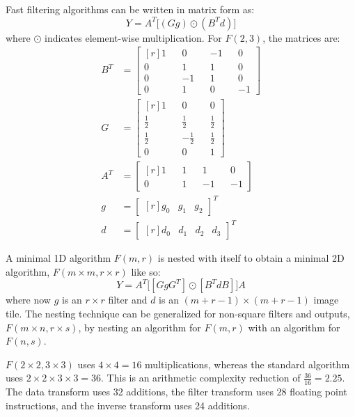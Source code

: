 \documentclass[10pt,twocolumn,letterpaper]{article}
\begin{document}
Fast filtering algorithms can be written in matrix form as:
\begin{equation}\label{eq:F_2_3_matrix}
Y = A^T \big[(G g) \odot( B^T d)\big]
\end{equation}
where $\odot$ indicates element-wise multiplication. For $F(2,3)$, the matrices are:
\begin{equation}\label{eq:F_2_2_3_3_matrices}
\begin{split}
B^T &= \begin{bmatrix*}[r]
1 && 0 && -1 && 0 \\
0 && 1 && 1 && 0 \\
0 && -1 && 1 && 0 \\
0 && 1 && 0 && -1
\end{bmatrix*} \\ 
G  &= \begin{bmatrix*}[r]
1 && 0 && 0 \\
\frac{1}{2} && \frac{1}{2} && \frac{1}{2} \\
\frac{1}{2} && - \frac{1}{2} && \frac{1}{2} \\
0 && 0 && 1
\end{bmatrix*} \\
A^T &= \begin{bmatrix*}[r]
1 && 1 && 1 && 0\\
0 && 1 && -1 && -1 
\end{bmatrix*} \\
g &= \begin{bmatrix*}[r]
g_0 & g_1 & g_2
\end{bmatrix*}^T \\
d &= \begin{bmatrix*}[r]
d_0 & d_1 & d_2 & d_3
\end{bmatrix*}^T
\end{split}
\end{equation}

A minimal 1D algorithm $F(m,r)$  is nested with itself to obtain a minimal 2D algorithm, $F(m \times m, r \times r)$ like so:
\begin{equation}\label{eq:general_2D_convolution}
Y = A^T \bigg[ [G g G^T] \odot [B^T d B] \bigg] A
\end{equation}
where now $g$ is an $r \times r$ filter and $d$ is an $(m+r-1) \times (m+r-1)$ image tile. The nesting technique can be generalized for non-square filters and outputs, $F(m \times n, r \times s)$, by nesting an algorithm for $F(m, r)$ with an algorithm for $F(n, s)$.

$F(2\times 2, 3\times 3)$ uses $4 \times 4 = 16$ multiplications, whereas the standard algorithm uses $2 \times 2 \times 3 \times 3 = 36$. This is an arithmetic complexity reduction of $\frac{36}{16} = 2.25$. The data transform uses 32 additions, the filter transform uses 28 floating point instructions, and the inverse transform uses 24 additions. 
\end{document}
